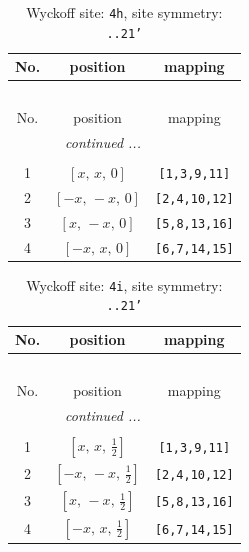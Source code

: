 \documentclass[fleqn,8pt]{jsarticle}
\begin{document}
\begin{longtable}{ccc}
\caption{Wyckoff site: {\tt 4h}, site symmetry: {\tt ..21'}}
 \\
 \hline \hline
No. & position & mapping \\ \hline \endfirsthead

\multicolumn{2}{l}{\tablename\ \thetable{}} \\
 \hline \hline
No. & position & mapping \\ \hline \endhead

 \hline \hline
\multicolumn{2}{r}{\footnotesize\it continued ...} \\ \endfoot

 \hline \hline
\multicolumn{2}{r}{} \\ \endlastfoot

1 & $\left[ x,\, x,\, 0 \right]$ & {\tt [1,3,9,11]} \\ \hline
2 & $\left[ - x,\, - x,\, 0 \right]$ & {\tt [2,4,10,12]} \\ \hline
3 & $\left[ x,\, - x,\, 0 \right]$ & {\tt [5,8,13,16]} \\ \hline
4 & $\left[ - x,\, x,\, 0 \right]$ & {\tt [6,7,14,15]} \\
\end{longtable}
\renewcommand{\arraystretch}{1.2}
\begin{longtable}{ccc}
\caption{Wyckoff site: {\tt 4i}, site symmetry: {\tt ..21'}}
 \\
 \hline \hline
No. & position & mapping \\ \hline \endfirsthead

\multicolumn{2}{l}{\tablename\ \thetable{}} \\
 \hline \hline
No. & position & mapping \\ \hline \endhead

 \hline \hline
\multicolumn{2}{r}{\footnotesize\it continued ...} \\ \endfoot

 \hline \hline
\multicolumn{2}{r}{} \\ \endlastfoot

1 & $\left[ x,\, x,\, \frac{1}{2} \right]$ & {\tt [1,3,9,11]} \\ \hline
2 & $\left[ - x,\, - x,\, \frac{1}{2} \right]$ & {\tt [2,4,10,12]} \\ \hline
3 & $\left[ x,\, - x,\, \frac{1}{2} \right]$ & {\tt [5,8,13,16]} \\ \hline
4 & $\left[ - x,\, x,\, \frac{1}{2} \right]$ & {\tt [6,7,14,15]} \\
\end{longtable}
\end{document}
